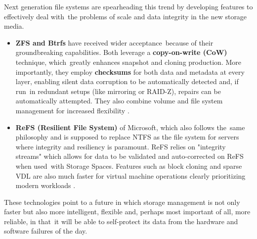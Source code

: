 \documentclass[12pt]{article}
\begin{document}
Next generation file systems are spearheading this trend by developing features to effectively deal with the problems of scale and data integrity in the new storage media.
\begin{itemize}
    \item \textbf{ZFS and Btrfs} have received wider acceptance because of their groundbreaking capabilities. Both leverage a \textbf{copy-on-write (CoW)} technique, which greatly enhances snapshot and cloning production. More importantly, they employ \textbf{checksums} for both data and metadata at every layer, enabling silent data corruption to be automatically detected and, if run in redundant setups (like mirroring or RAID-Z), repairs can be automatically attempted. They also combine volume and file system management for increased flexibility \parencite{Nfina2025BtrfsZFS}.
    \item \textbf{ReFS (Resilient File System)} of Microsoft, which also follows the same philosophy and is supposed to replace NTFS as the file system for servers where integrity and resiliency is paramount. ReFS relies on "integrity streams" which allows for data to be validated and auto-corrected on ReFS when used with Storage Spaces. Features such as block cloning and sparse VDL are also much faster for virtual machine operations clearly prioritizing modern workloads \parencite{Microsoft2025ReFS}.
\end{itemize}
These technologies point to a future in which storage management is not only faster but also more intelligent, flexible and, perhaps most important of all, more reliable, in that it will be able to self-protect its data from the hardware and software failures of the day. 






\newpage
\printbibliography[title={References}]

\end{document}
